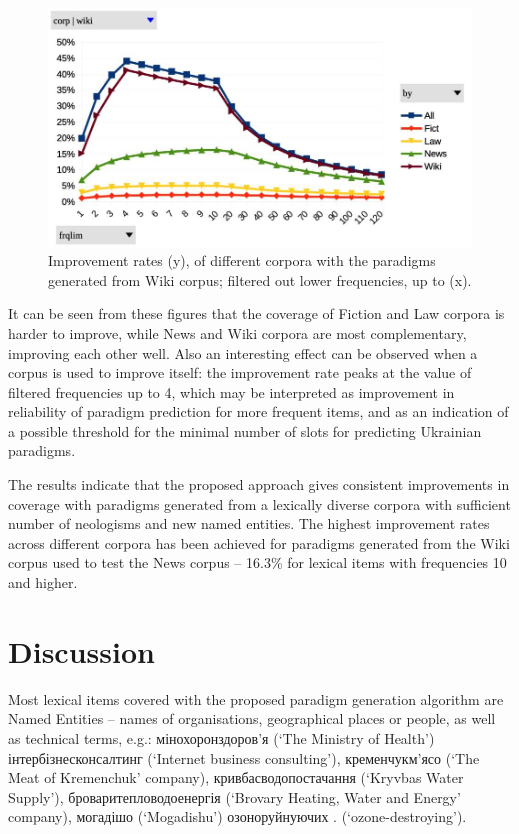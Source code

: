 \documentclass[11pt,a4paper]{article}
\begin{document}
\begin{figure}
	\includegraphics[width=\linewidth]{evaluation-improv-DiffNoTypWiki.jpg}
	\caption{Improvement rates (y), of different corpora with the paradigms generated from Wiki corpus; filtered out lower frequencies, up to (x).}
	\label{fig:pcDiffNoTypWiki}
\end{figure}


It can be seen from these figures that the coverage of Fiction and Law corpora is harder to improve, while News and Wiki corpora are most complementary, improving each other well. Also an interesting effect can be observed when a corpus is used to improve itself: the improvement rate peaks at the value of filtered frequencies up to 4, which may be interpreted as improvement in reliability of paradigm prediction for more frequent items, and as an indication of a possible threshold for the minimal number of slots for predicting Ukrainian paradigms.

The results indicate that the proposed approach gives consistent improvements in coverage with paradigms generated from a lexically diverse corpora with sufficient number of neologisms and new named entities. The highest improvement rates across different corpora has been achieved for paradigms generated from the Wiki corpus used to test the News corpus -- 16.3\% for lexical items with frequencies 10 and higher.


\section{Discussion}
\label{sec:Discussion}

Most lexical items covered with the proposed paradigm generation algorithm are Named Entities -- names of organisations, geographical places or people, as well as technical terms, e.g.: мінохоронздоров'я  (`The Ministry of Health') 
інтербізнесконсалтинг  (`Internet business consulting'), кременчукм'ясо  (`The Meat of Kremenchuk' company), кривбасводопостачання  (`Kryvbas Water Supply'), броваритепловодоенергія  (`Brovary Heating, Water and Energy' company), могадішо  (`Mogadishu')
озоноруйнуючих . (`ozone-destroying'). 
\end{document}

